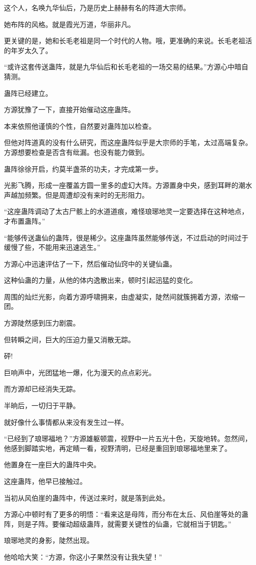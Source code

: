 \begin{this_body}
这个人，名唤九华仙后，乃是历史上赫赫有名的阵道大宗师。

她布阵的风格。就是霞光万道，华丽非凡。

更关键的是，她和长毛老祖是同一个时代的人物。哦，更准确的来说。长毛老祖活的年岁太久了。

“或许这套传送蛊阵，就是九华仙后和长毛老祖的一场交易的结果。”方源心中暗自猜测。

蛊阵已经建立。

方源犹豫了一下，直接开始催动这座蛊阵。

本来依照他谨慎的个性，自然要对蛊阵加以检查。

但他对阵道真的没有什么研究，而这座蛊阵似乎是大宗师的手笔，太过高端复杂。方源想要检查是否含有纰漏。也没有能力做到。

蛊阵徐徐开启，约莫半盏茶的功夫，才完成第一步。

光影飞腾，形成一座覆盖方圆一里多的虚幻大阵。方源置身中央，感到耳畔的潮水声越加频繁。但是周遭却没有来时的无形阻力。

“这座蛊阵调动了太古尸骸上的水道道痕，难怪琅琊地灵一定要选择在这种地点，才布置蛊阵。”

“能够传送蛊仙的蛊阵，很是稀少。这座蛊阵虽然能够传送，不过启动的时间过于缓慢了些，不能用来迅速逃生。”

方源心中迅速评估了一下，然后催动仙窍中的关键仙蛊。

这种仙蛊的力量，从他的体内逸散出来，顿时引起迅猛的变化。

周围的灿烂光影，向着方源呼啸拥来，由虚凝实，陡然间就簇拥着方源，浓缩一团。

方源陡然感到压力剧震。

但转瞬之间，巨大的压迫力量又消散无踪。

砰!

巨响声中，光团猛地一爆，化为漫天的点点彩光。

而方源却已经消失无踪。

半晌后，一切归于平静。

就好像什么事情都从来没有发生过一样。

“已经到了琅琊福地？”方源雄躯顿震，视野中一片五光十色，天旋地转。忽然间，他感到脚踏实地，再定睛一看，视野清明，已经是重回到琅琊福地里来了。

他置身在一座巨大的蛊阵中央。

这座蛊阵，他早已接触过。

当初从风伯崖的蛊阵中，传送过来时，就是落到此处。

方源心中顿时有了更多的明悟：“看来这是母阵，而分布在太丘、风伯崖等处的蛊阵，则是子阵。要催动超级蛊阵，就需要关键性的仙蛊，它就相当于钥匙。”

琅琊地灵的身影，陡然出现。

他哈哈大笑：“方源，你这小子果然没有让我失望！”

\end{this_body}

